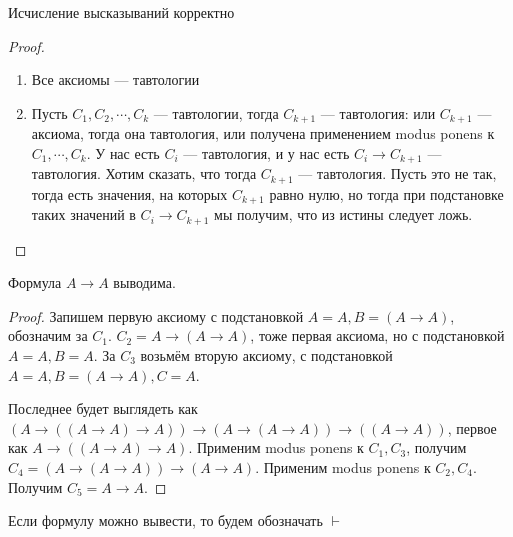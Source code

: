 \begin{theorem}
	Исчисление высказываний корректно
\end{theorem}
\begin{proof}
	\begin{enumerate}
		\item{Все аксиомы --- тавтологии}
		\item{Пусть $C_1, C_2, \cdots, C_k$ --- тавтологии, тогда $C_{k+1}$ --- тавтология: или $C_{k+1}$ --- аксиома, тогда она тавтология, или получена применением modus ponens к $C_1, \cdots, C_k$. У нас есть $C_i$ --- тавтология, и у нас есть $C_i \to C_{k+1}$ --- тавтология. Хотим сказать, что тогда $C_{k+1}$ --- тавтология. Пусть это не так, тогда есть значения, на которых $C_{k+1}$ равно нулю, но тогда при подстановке таких значений в $C_i \to C_{k+1}$ мы получим, что из истины следует ложь.}
	\end{enumerate}
\end{proof}

\begin{lemma}
	Формула $A \to A$ выводима. 
\end{lemma}
\begin{proof}
	Запишем первую аксиому с подстановкой $A = A, B = (A \to A)$, обозначим за $C_1$. $C_2 = A \to (A \to A)$, тоже первая аксиома, но с подстановкой $A=A, B=A$. За $C_3$ возьмём вторую аксиому, с подстановкой $A=A, B=(A \to A), C=A$.

	Последнее будет выглядеть как $(A \to ((A \to A) \to A)) \to (A \to (A \to A)) \to ((A \to A))$, первое как $A \to ((A \to A) \to A)$. Применим modus ponens к $C_1, C_3$, получим $C_4 = (A \to (A \to A)) \to (A \to A)$. Применим modus ponens к $C_2, C_4$. Получим $C_5 = A \to A$. 
\end{proof}

\begin{definition}
	Если формулу можно вывести, то будем обозначать $\vdash$
\end{definition}

